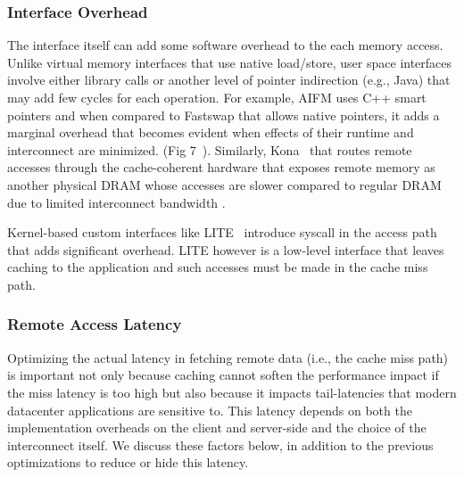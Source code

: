 \subsubsection{Interface Overhead}
The interface itself can add some software overhead 
to the each memory access. Unlike virtual memory 
interfaces that use native load/store, user space 
interfaces involve either library calls or another 
level of pointer indirection (e.g., Java) that may add 
few cycles for each operation. For example, AIFM uses
C++ smart pointers and when compared to Fastswap that 
allows native pointers, it adds a marginal overhead 
that becomes evident when effects of their runtime and 
interconnect are minimized. (Fig 7~\cite{aifm}). 
Similarly, Kona~\cite{kona} that routes remote accesses
through the cache-coherent hardware that exposes remote 
memory as another physical DRAM whose accesses are 
slower compared to regular DRAM due to limited interconnect 
bandwidth .

Kernel-based custom interfaces like LITE~\cite{literdma} 
introduce syscall in the access path that adds 
significant overhead. LITE however is a low-level 
interface that leaves caching to the application and 
such accesses must be made in the cache miss path. 


\subsubsection{Remote Access Latency} 
Optimizing the actual latency in fetching remote data 
(i.e., the cache miss path) is important not only because 
caching cannot soften the performance impact if the miss 
latency is too high but also because it impacts tail-latencies 
that modern datacenter applications are sensitive to. 
This latency depends on both the implementation 
overheads on the client and server-side and the choice of 
the interconnect itself. We discuss these factors below, 
in addition to the previous optimizations to reduce or 
hide this latency.

